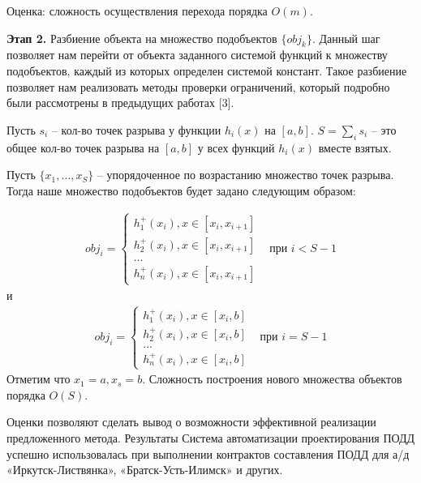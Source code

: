 Оценка: сложность осуществления перехода порядка $O(m)$.


\textbf{Этап 2.} Разбиение объекта  на множество подобъектов $\{obj_k\}$.
Данный шаг позволяет нам перейти от объекта заданного системой функций к множеству подобъектов, каждый из которых определен системой констант. Такое разбиение позволяет нам реализовать методы проверки ограничений, который подробно были рассмотрены в предыдущих работах [3]. 

Пусть $s_i$ -- кол-во точек разрыва у функции $h_i(x)$ на $[a, b]$. $S = \sum_{i}s_i$ -- это общее кол-во точек разрыва на $[a,b]$ у всех функций $h_i(x)$ вместе взятых. 

Пусть $\{x_1, \dots, x_S\}$ -- упорядоченное по возрастанию множество точек разрыва. Тогда наше множество подобъектов будет задано следующим образом:
 
$$
\begin{aligned}
	obj_i = 
	\begin{cases}
		h^+_1(x_i), x \in [x_i, x_{i+1}] \\
		h^+_2(x_i), x \in [x_i, x_{i+1}] \\
		\dots \\
		h^+_n(x_i), x \in [x_i, x_{i+1}]
	\end{cases}
\end{aligned}
\begin{aligned}
\text{при } i < S - 1
\end{aligned}
$$
и
$$
\begin{aligned}
	obj_i = 
	\begin{cases}
		h^+_1(x_i), x \in [x_i, b] \\
		h^+_2(x_i), x \in [x_i, b] \\
		\dots \\
		h^+_n(x_i), x \in [x_i, b]
	\end{cases}
\end{aligned}
\begin{aligned}
\text{при } i = S - 1
\end{aligned}
$$
Отметим что $x_1 = a, x_s = b$. Сложность построения нового множества объектов порядка $O(S)$.

Оценки позволяют сделать вывод о возможности эффективной реализации предложенного метода.
Результаты
Система автоматизации проектирования ПОДД успешно использовалась при выполнении контрактов составления  ПОДД для а/д  «Иркутск-Листвянка», «Братск-Усть-Илимск» и других. 

